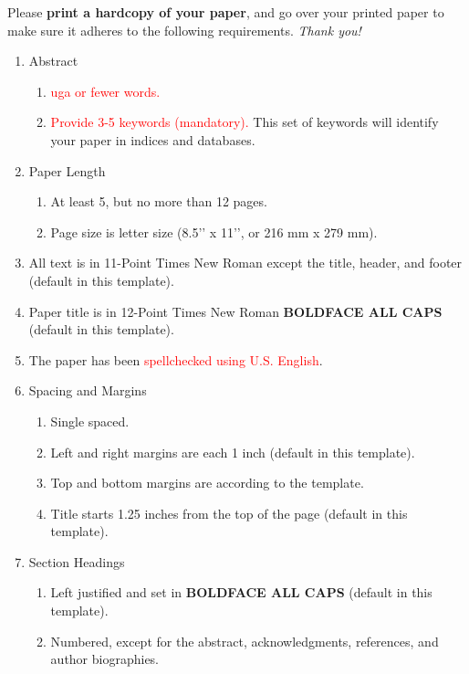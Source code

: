 \documentclass{scspaperproc}
\theoremstyle{scsthe}
\begin{document}
    Please \textbf{print a hardcopy of your paper}, and go over your printed paper to make sure it adheres to the following requirements. \textit{Thank you!}
    \begin{enumerate}
        \item Abstract
        \begin{enumerate}
            \item \textcolor{red}{uga or fewer words.}
            \item \textcolor{red}{Provide 3-5 keywords (mandatory).} This set of keywords will identify your paper in indices and databases.
        \end{enumerate}
        \item Paper Length
        \begin{enumerate}
            \item At least 5, but no more than 12 pages.
            \item Page size is letter size (8.5’’ x 11’’, or 216 mm x 279 mm).
        \end{enumerate}
        \item All text is in 11-Point Times New Roman except the title, header, and footer (default in this template).
        \item Paper title is in 12-Point Times New Roman \textbf{BOLDFACE ALL CAPS} (default in this template).
        \item The paper has been \textcolor{red}{spellchecked using U.S. English}.
        \item Spacing and Margins
        \begin{enumerate}
            \item Single spaced.
            \item Left and right margins are each 1 inch (default in this template).
            \item Top and bottom margins are according to the template.
            \item Title starts 1.25 inches from the top of the page (default in this template).
        \end{enumerate}
        \item Section Headings
        \begin{enumerate}
            \item Left justified and set in \textbf{BOLDFACE ALL CAPS} (default in this template).
            \item Numbered, except for the abstract, acknowledgments, references, and author biographies.

\end{enumerate}
\end{enumerate}
\end{document}
